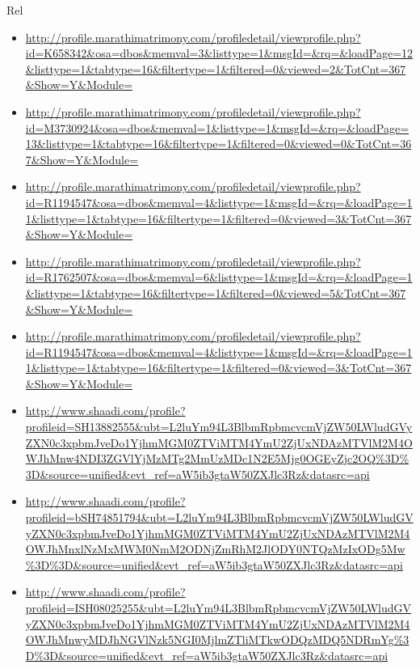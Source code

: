 \documentclass[serif, mathserif, final]{beamer}
\begin{document}
\begin{frame}
\begin{columns}
\begin{column}{0.25\linewidth}
\begin{block}{Rel}


\begin{itemize}
    \item \small
      \url{http://profile.marathimatrimony.com/profiledetail/viewprofile.php?id=K658342&osa=dbos&memval=3&listtype=1&msgId=&rq=&loadPage=12&listtype=1&tabtype=16&filtertype=1&filtered=0&viewed=2&TotCnt=367&Show=Y&Module=}

\item \small \url{http://profile.marathimatrimony.com/profiledetail/viewprofile.php?id=M3730924&osa=dbos&memval=1&listtype=1&msgId=&rq=&loadPage=13&listtype=1&tabtype=16&filtertype=1&filtered=0&viewed=0&TotCnt=367&Show=Y&Module=}

\item \small \url{http://profile.marathimatrimony.com/profiledetail/viewprofile.php?id=R1194547&osa=dbos&memval=4&listtype=1&msgId=&rq=&loadPage=11&listtype=1&tabtype=16&filtertype=1&filtered=0&viewed=3&TotCnt=367&Show=Y&Module=}

\item \small \url{http://profile.marathimatrimony.com/profiledetail/viewprofile.php?id=R1762507&osa=dbos&memval=6&listtype=1&msgId=&rq=&loadPage=1&listtype=1&tabtype=16&filtertype=1&filtered=0&viewed=5&TotCnt=367&Show=Y&Module=}

\item \small \url{http://profile.marathimatrimony.com/profiledetail/viewprofile.php?id=R1194547&osa=dbos&memval=4&listtype=1&msgId=&rq=&loadPage=11&listtype=1&tabtype=16&filtertype=1&filtered=0&viewed=3&TotCnt=367&Show=Y&Module=}

\item \small \url{http://www.shaadi.com/profile?profileid=SH13882555&ubt=L2luYm94L3BlbmRpbmcvcmVjZW50LWludGVyZXN0c3xpbmJveDo1YjhmMGM0ZTViMTM4YmU2ZjUxNDAzMTVlM2M4OWJhMnw4NDI3ZGVlYjMzMTg2MmUzMDc1N2E5Mjg0OGEyZjc2OQ\%3D\%3D&source=unified&evt_ref=aW5ib3gtaW50ZXJlc3Rz&datasrc=api}

\item \small \url{http://www.shaadi.com/profile?profileid=bSH74851794&ubt=L2luYm94L3BlbmRpbmcvcmVjZW50LWludGVyZXN0c3xpbmJveDo1YjhmMGM0ZTViMTM4YmU2ZjUxNDAzMTVlM2M4OWJhMnxlNzMxMWM0NmM2ODNjZmRhM2JlODY0NTQzMzIxODg5Mw\%3D\%3D&source=unified\&evt_ref=aW5ib3gtaW50ZXJlc3Rz&datasrc=api}

\item \small
  \url{http://www.shaadi.com/profile?profileid=ISH08025255&ubt=L2luYm94L3BlbmRpbmcvcmVjZW50LWludGVyZXN0c3xpbmJveDo1YjhmMGM0ZTViMTM4YmU2ZjUxNDAzMTVlM2M4OWJhMnwyMDJhNGVlNzk5NGI0MjlmZTliMTkwODQzMDQ5NDRmYg\%3D\%3D&source=unified&evt_ref=aW5ib3gtaW50ZXJlc3Rz&datasrc=api}
\end{itemize} 


\end{block} 
\end{column}%

\end{columns}
\end{frame}

    
\end{document}
